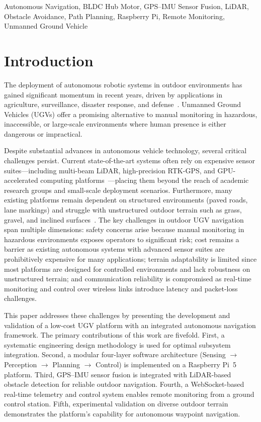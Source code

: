 \documentclass[conference]{IEEEtran}
\begin{document}
\begin{IEEEkeywords}
Autonomous Navigation, BLDC Hub Motor, GPS--IMU Sensor Fusion, LiDAR, Obstacle Avoidance, Path Planning, Raspberry Pi, Remote Monitoring, Unmanned Ground Vehicle
\end{IEEEkeywords}

\section{Introduction}

The deployment of autonomous robotic systems in outdoor environments has gained significant momentum in recent years, driven by applications in agriculture, surveillance, disaster response, and defense~\cite{azam2020system, fernandez2019unmanned}. Unmanned Ground Vehicles (UGVs) offer a promising alternative to manual monitoring in hazardous, inaccessible, or large-scale environments where human presence is either dangerous or impractical.

Despite substantial advances in autonomous vehicle technology, several critical challenges persist. Current state-of-the-art systems often rely on expensive sensor suites---including multi-beam LiDAR, high-precision RTK-GPS, and GPU-accelerated computing platforms~\cite{dolya2025development}---placing them beyond the reach of academic research groups and small-scale deployment scenarios. Furthermore, many existing platforms remain dependent on structured environments (paved roads, lane markings) and struggle with unstructured outdoor terrain such as grass, gravel, and inclined surfaces~\cite{jiang2024risk}. The key challenges in outdoor UGV navigation span multiple dimensions: safety concerns arise because manual monitoring in hazardous environments exposes operators to significant risk; cost remains a barrier as existing autonomous systems with advanced sensor suites are prohibitively expensive for many applications; terrain adaptability is limited since most platforms are designed for controlled environments and lack robustness on unstructured terrain; and communication reliability is compromised as real-time monitoring and control over wireless links introduce latency and packet-loss challenges.

This paper addresses these challenges by presenting the development and validation of a low-cost UGV platform with an integrated autonomous navigation framework. The primary contributions of this work are fivefold. First, a systematic engineering design methodology is used for optimal subsystem integration. Second, a modular four-layer software architecture (Sensing $\rightarrow$ Perception $\rightarrow$ Planning $\rightarrow$ Control) is implemented on a Raspberry Pi~5 platform. Third, GPS--IMU sensor fusion is integrated with LiDAR-based obstacle detection for reliable outdoor navigation. Fourth, a WebSocket-based real-time telemetry and control system enables remote monitoring from a ground control station. Fifth, experimental validation on diverse outdoor terrain demonstrates the platform's capability for autonomous waypoint navigation.
\end{document}
